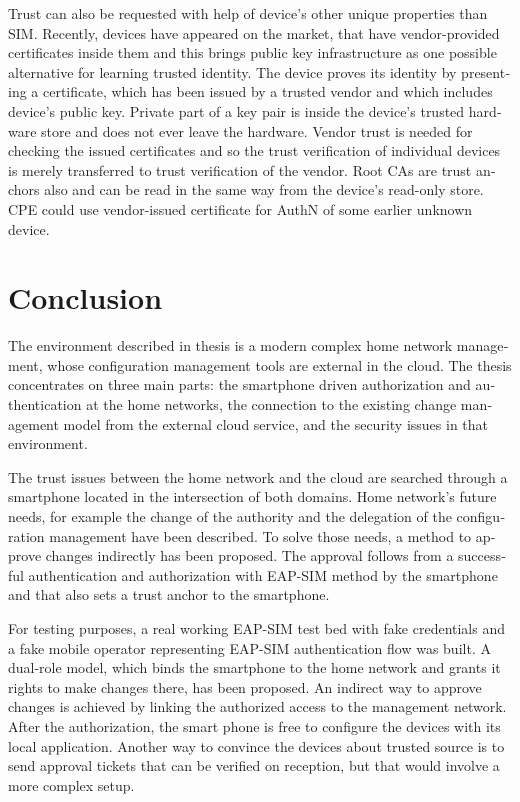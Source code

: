 \documentclass[12pt,a4paper,english]{tutthesis}
\begin{document}
\begin{otherlanguage}{english}
Trust can also be requested with help of device's other unique
properties than SIM. Recently, devices have appeared on the market, that have
vendor-provided certificates inside them and this brings public key
infrastructure as one possible alternative for learning trusted
identity.  The device proves its identity by presenting a certificate,
which has been issued by a trusted vendor and which includes device's
public key.  Private part of a key pair is inside the device's trusted
hardware store and does not ever leave the hardware. Vendor trust is
needed for checking the issued certificates and so the trust
verification of individual devices is merely transferred to trust
verification of the vendor.  Root CAs are trust anchors also and can
be read in the same way from the device's read-only store.  CPE could
use vendor-issued certificate for AuthN of some earlier unknown
device.

\chapter{Conclusion}
\label{sec-7}



The environment described in thesis is a modern complex home network
management, whose configuration management tools are external in the
cloud.  The thesis concentrates on three main parts:
the smartphone driven authorization and authentication at the home
networks, the connection to the existing change management model from
the external cloud service, and the security issues in that environment.

The trust issues between the home network and the cloud are searched
through a smartphone located in the intersection of both domains.
Home network's future needs, for example the change of the authority
and the delegation of the configuration management have been
described.
To solve those needs, a method to approve changes indirectly has been
proposed. The approval follows from a successful authentication and
authorization with EAP-SIM method by the smartphone and that also sets
a trust anchor to the smartphone.


For testing purposes, a real working EAP-SIM test bed with fake credentials and
a fake mobile operator representing EAP-SIM authentication flow was
built. A dual-role model, which binds the smartphone to the home network and
grants it rights to make changes there, has been proposed.  
An indirect way to approve changes is achieved by linking the authorized
access to the management network. After the authorization, the smart
phone is free to configure the devices with its local application.
Another way to convince the
devices about trusted source is to send approval tickets that can
be verified on reception, but that would involve a more complex setup.


\end{otherlanguage}
\end{document}
